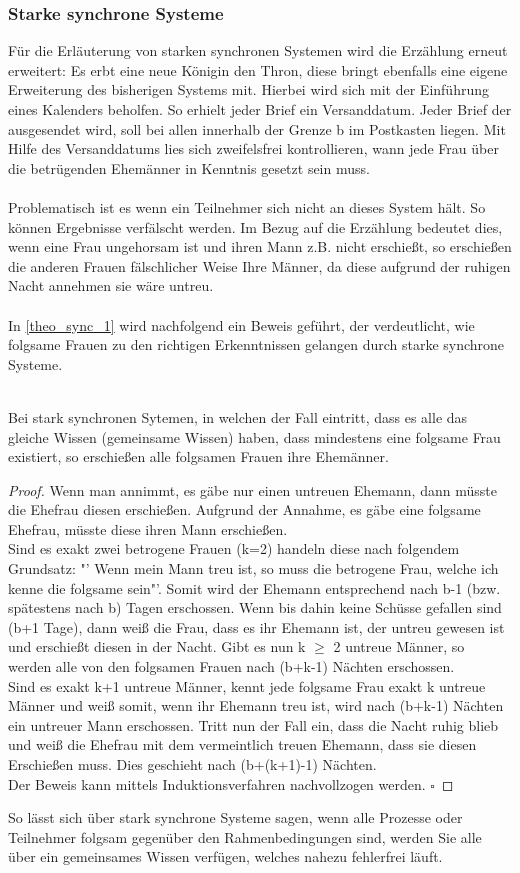 \subsubsection{Starke synchrone Systeme}
\label{stark_sync_wissen}
Für die Erläuterung von starken synchronen Systemen wird die Erzählung erneut erweitert: Es erbt eine neue Königin den Thron, diese bringt ebenfalls eine eigene Erweiterung des bisherigen Systems mit. Hierbei wird sich mit der Einführung eines Kalenders beholfen. So erhielt jeder Brief ein Versanddatum. Jeder Brief der ausgesendet wird, soll bei allen innerhalb der Grenze b im Postkasten liegen. Mit Hilfe des Versanddatums lies sich zweifelsfrei kontrollieren, wann jede Frau über die betrügenden Ehemänner in Kenntnis gesetzt sein muss.\\\\ 
Problematisch ist es wenn ein Teilnehmer sich nicht an dieses System hält. So können Ergebnisse verfälscht werden. Im Bezug auf die Erzählung bedeutet dies, wenn eine Frau ungehorsam ist und ihren Mann z.B. nicht erschießt, so erschießen die anderen Frauen fälschlicher Weise Ihre Männer, da diese aufgrund der ruhigen Nacht annehmen sie wäre untreu.\\\\
In \ref{theo_sync_1} wird nachfolgend ein Beweis geführt, der verdeutlicht, wie folgsame Frauen zu den richtigen Erkenntnissen gelangen durch starke synchrone Systeme. 
\begin{theorem}\\
\label{theo_sync_1}
Bei stark synchronen Sytemen, in welchen der Fall eintritt, dass es alle das gleiche Wissen (gemeinsame Wissen) haben,  dass mindestens eine folgsame Frau existiert, so erschießen alle folgsamen Frauen ihre Ehemänner.
\end{theorem}
\begin{proof}
Wenn man annimmt, es gäbe nur einen untreuen Ehemann, dann müsste die Ehefrau diesen erschießen. Aufgrund der Annahme, es gäbe eine folgsame Ehefrau, müsste diese ihren Mann erschießen.\\
Sind es exakt zwei betrogene Frauen (k=2) handeln diese nach folgendem Grundsatz: "' Wenn mein Mann treu ist, so muss die betrogene Frau, welche ich kenne die folgsame sein"'. Somit wird der Ehemann entsprechend nach b-1 (bzw. spätestens nach b) Tagen erschossen. Wenn bis dahin keine Schüsse gefallen sind (b+1 Tage), dann weiß die Frau, dass es ihr Ehemann ist, der untreu gewesen ist und erschießt diesen in der Nacht. Gibt es nun k $\geq$ 2 untreue Männer, so werden alle von den folgsamen Frauen nach (b+k-1) Nächten erschossen.\\
Sind es exakt k+1 untreue Männer, kennt jede folgsame Frau exakt k untreue Männer und weiß somit, wenn ihr Ehemann treu ist, wird  nach (b+k-1) Nächten ein untreuer Mann erschossen. Tritt nun der Fall ein, dass die Nacht ruhig blieb und weiß die Ehefrau mit dem vermeintlich treuen Ehemann, dass sie diesen Erschießen muss. Dies geschieht nach (b+(k+1)-1) Nächten. \\ Der Beweis kann mittels Induktionsverfahren nachvollzogen werden.
$\square$
\end{proof}
So lässt sich über stark synchrone Systeme sagen, wenn alle Prozesse oder Teilnehmer folgsam gegenüber den Rahmenbedingungen sind, werden Sie alle über ein gemeinsames Wissen verfügen, welches nahezu fehlerfrei läuft.